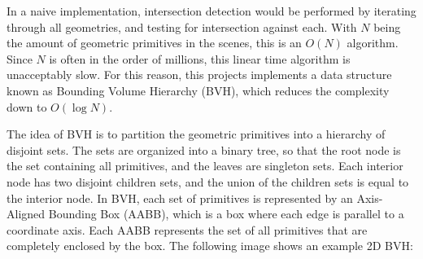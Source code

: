 In a naive implementation, intersection detection would be performed by iterating through all geometries, and testing for intersection against each. With $N$ being the amount of geometric primitives in the scenes, this is an $O(N)$ algorithm. Since $N$ is often in the order of millions, this linear time algorithm is unacceptably slow. For this reason, this projects implements a data structure known as Bounding Volume Hierarchy (BVH), which reduces the complexity down to $O(\log N)$.

The idea of BVH is to partition the geometric primitives into a hierarchy of disjoint sets. The sets are organized into a binary tree, so that the root node is the set containing all primitives, and the leaves are singleton sets. Each interior node has two disjoint children sets, and the union of the children sets is equal to the interior node. In BVH, each set of primitives is represented by an Axis-Aligned Bounding Box (AABB), which is a box where each edge is parallel to a coordinate axis. Each AABB represents the set of all primitives that are completely enclosed by the box. The following image shows an example 2D BVH:
